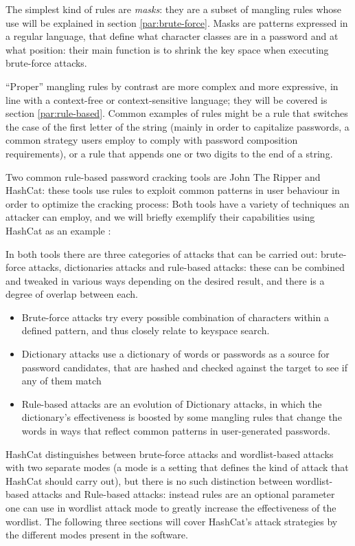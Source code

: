 The simplest kind of rules are \emph{masks}: they are a subset of mangling rules whose use will be explained in section \ref{par:brute-force}. Masks are patterns expressed in a regular language, that define what character classes are in a password and at what position: their main function is to shrink the key space when executing brute-force attacks.

\enquote{Proper} mangling rules by contrast are more complex and more expressive, in line with a context-free or context-sensitive language; they will be covered is section \ref{par:rule-based}.
Common examples of rules might be a rule that switches the case of the first letter of the string (mainly in order to capitalize passwords, a common strategy users employ to comply with password composition requirements), or a rule that appends one or two digits to the end of a string. 

Two common rule-based password cracking tools are John The Ripper and \break \mbox{HashCat}\cite{john,hash_cat}: these tools use rules to exploit common patterns in user behaviour in order to optimize the cracking process: Both tools have a variety of techniques an attacker can employ, and we will briefly exemplify their capabilities using HashCat as an example \cite{hash_cat_wiki}:

In both tools there are three categories of attacks that can be carried out: brute-force attacks, dictionaries attacks and rule-based attacks: these can be combined and tweaked in various ways depending on the desired result, and there is a degree of overlap between each.


\begin{itemize}
\item Brute-force attacks try every possible combination of characters within a defined pattern, and thus closely relate to keyspace search. 
\item Dictionary attacks use a dictionary of words or passwords as a source for password candidates, that are hashed and checked against the target to see if any of them match
\item Rule-based attacks are an evolution of Dictionary attacks, in which the dictionary's effectiveness is boosted by some mangling rules that change the words in ways that reflect common patterns in user-generated passwords.
\end{itemize}

HashCat distinguishes between brute-force attacks and wordlist-based attacks with two separate modes (a mode is a setting that defines the kind of attack that HashCat should carry out), but there is no such distinction between wordlist-based attacks and Rule-based attacks: instead rules are an optional parameter one can use in wordlist attack mode to greatly increase the effectiveness of the wordlist. The following three sections will cover HashCat's attack strategies by the different modes present in the software. 

